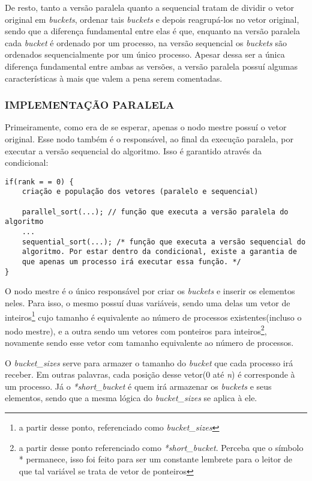 	De resto, tanto a versão paralela quanto a sequencial tratam de dividir o vetor original em \textit{buckets}, ordenar tais \textit{buckets} e depois reagrupá-los no vetor original, sendo que a diferença fundamental entre elas é que, enquanto na versão paralela cada \textit{bucket} é ordenado por um processo, na versão sequencial os \textit{buckets} são ordenados sequencialmente por um único processo. Apesar dessa ser a única diferença fundamental entre ambas as versões, a versão paralela possuí algumas características à mais que valem a pena serem comentadas.
	
		\subsubsection{\normalsize IMPLEMENTAÇÃO PARALELA}
			Primeiramente, como era de se esperar, apenas o nodo mestre possuí o vetor original. Esse nodo também é o responsável, ao final da execução paralela, por executar a versão sequencial do algoritmo. Isso é garantido através da condicional:
			
			\begin{lstlisting}[style=C] 			
if(rank = = 0) {
	criação e população dos vetores (paralelo e sequencial)
	
	parallel_sort(...); // função que executa a versão paralela do algoritmo
	...
	sequential_sort(...); /* função que executa a versão sequencial do 
	algoritmo. Por estar dentro da condicional, existe a garantia de 
	que apenas um processo irá executar essa função. */
}
\end{lstlisting}
			
			O nodo mestre é o único responsável por criar os \textit{buckets} e inserir os elementos neles. Para isso, o mesmo possuí duas variáveis, sendo uma delas um vetor de inteiros\footnote{a partir desse ponto, referenciado como \textit{bucket\_sizes}} cujo tamanho é equivalente ao número de processos existentes(incluso o nodo mestre), e a outra sendo um vetores com ponteiros para inteiros\footnote{a partir desse ponto referenciado como \textit{*short\_bucket}. Perceba que o símbolo * permanece, isso foi feito para ser um constante lembrete para o leitor de que tal variável se trata de vetor de ponteiros}, novamente sendo esse vetor com tamanho equivalente ao número de processos.
			
			
			O \textit{bucket\_sizes} serve para armazer o tamanho do \textit{bucket} que cada processo irá receber. Em outras palavras, cada posição desse vetor(0 até \textit{n}) é corresponde à um processo. Já o \textit{*short\_bucket} é quem irá armazenar os \textit{buckets} e seus elementos, sendo que a mesma lógica do \textit{bucket\_sizes} se aplica à ele.
			
